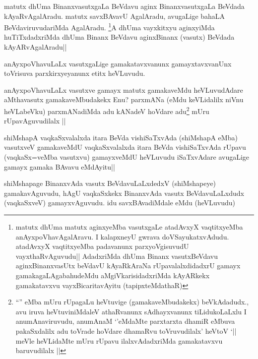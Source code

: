 \begin{artha}
matutx dhUma BinanxvasutxgaLa BeVdavu aginx BinanxvasutxgaLa BeVdada kAyaRvAgalAradu. matutx savxBAvavU AgalAradu, avugaLige bahaLA BeVdaviruvudariMda AgalAradu. \footnote[2]{matutx dhUma matutx aginxyeMba vasutxgaLe atadAvxyX vaqtitxyeMba anAyxpoVhavAgalAravu. I kalapxneyU gwrava doVSayukatxvAdudu. atadAvxyX vaqtitxyeMba padavanunx parxyoVgisuvudU vayxthaRvAguvudu|| AdadxriMda dhUma Binanx vasutxBeVdavu aginxBinanxvasUtx beVdavU kAyaRkAraNa rUpavalalxdidadxrU gamayx gamakagaLAgabahudeMdu aMgiVkarisidadxriMda kAyARkekx gamakatavxvu vayxBicaritavAyitu (tapipxteMdathaR)}A dhUma vayxkitxyu aginxyiMda huTiTxdadxriMda dhUma Binanx BeVdavu aginxBinanx (vasutx) BeVdada kAyARvAgalAradu||
\end{artha}

\begin{artha}
anAyxpoVhavuLaLx vasutxgaLige gamakatavxvanunx gamayxtavxvanUnx toVrisuva parxkirxyeyanunx etitx heVLuvudu.
\end{artha}

\begin{artha}
anAyxpoVhavuLaLx vasutxve gamayx matutx gamakaveMdu heVLuvudAdare aMthavasutx gamakaveMbudakekx Enu? parxmANa (eMdu keVLidalilx niVnu heVLabeVku) parxmANadiMda adu kANadeV hoVdare adu\footnote[1]{``\stext'' eMba mUru rUpagaLu heVtuvige (gamakaveMbudakekx) beVkAdadudx., avu iruva heVtuviniMdaleV athaRvanunx sAdhayxvanunx tiLidukoLaLxlu I anumAnaviruvudu, anumAnaM `\stext'eMdaMte parxtarxta dhamiR eMbuva pakaSxdalilx adu toVrade hoVdare dhamaRvu toVruvudilalx' heVtoV `\stext \stext || meVle heVLidaMte mUru rUpavu ilalxvAdadxriMda gamakatavxvu baruvudilalx ||} mUru rUpavAguvudilalx ||
\end{artha}

\begin{artha}
shiMshapA vaqkaSxvalalxda itara BeVda vishiSaTxvAda (shiMshapA eMba) vasutxveV gamakaveMdU vaqkaSxvalalxda itara BeVda vishiSaTxvAda rUpavu (vaqkaSx=veMba vasutxvu) gamayxveMdU heVLuvudu iSaTxvAdare avugaLige gamayx gamaka BAvavu eMdAyitu||
\end{artha}


\begin{artha}
shiMshapage BinanxvAda vasutx BeVdavuLaLxdedxV (shiMshapeye) gamakavAguvudu, hAgU vaqkaSxkekx BinanxvAda vasutx BeVdavuLaLxdudx (vaqkaSxveV) gamayxvAguvudu. idu savxBAvadiMdale eMdu (heVLuvudu)
\end{artha}


